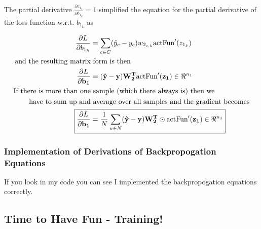 \documentclass[]{article}
\begin{document}
The partial derivative  $\frac{\partial z_{1_k}} {\partial b_{1_{k}} } =1$ simplified the equation for the partial derivative of the loss function w.r.t. $b_{1_{k}} $ as

\begin{align*}
\frac{\partial L}{\partial b_{1_{k}}} &= \sum_{c\in C}( \hat{y}_c - y_c) w_{2_{c,k}}\text{actFun}'(z_{1_k})\\
\text{and the resulting matrix} &\text{ form is then}\\
\frac{\partial L}{\partial \mathbf{b_1}} &=(\mathbf{ \hat{y}} - \mathbf{y}) \mathbf{W_2^T} \text{actFun}'(\mathbf{z_1})\in \Re^{n_1} \\
\text{If there is more than one}&\text{ sample (which there always is) then we}\\
\text{have to sum up and}& \text{ average over all samples and the gradient becomes}\\
\Aboxed{ \frac{\partial L}{\partial \mathbf{b_1}} &=  \frac{1}{N} \sum_{n\in N}( \mathbf{ \hat{y}} - \mathbf{y}) \mathbf{W_2^T} \odot \text{actFun}'(\mathbf{z_1})\in \Re^{n_1} } \\
\end{align*}

\subsubsection{Implementation of Derivations of Backpropogation Equations}
If you look in my code you can see I implemented the backpropogation equations correctly.

\subsection{Time to Have Fun - Training!}
\end{document}
